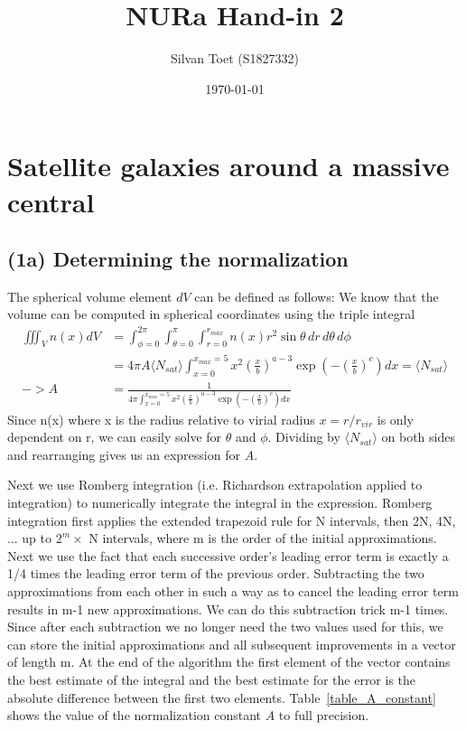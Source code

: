 \documentclass{article}
\title{NURa Hand-in 2}
\author{Silvan Toet (S1827332)}
\date{\today}
\begin{document}
\maketitle

\section{Satellite galaxies around a massive central}

\subsection{(1a) Determining the normalization}
The spherical volume element \(dV\) can be defined as follows:
We know that the volume can be computed in spherical coordinates using the triple integral
\begin{align}
  \iiint_V n(x) dV & = \int_{\phi=0}^{2\pi} \int_{\theta=0}^{\pi} \int_{r=0}^{r_{max}} n(x) r^2 \sin\theta \, dr\,d\theta\,d\phi                                                \\
                   & = 4 \pi A \langle N_{sat} \rangle \int_{x=0}^{x_{max}=5} x^2 \left(\frac{x}{b}\right)^{a-3} \exp(-\left(\frac{x}{b}\right)^c) dx = \langle N_{sat} \rangle \\
  -> A             & = \frac{1}{4 \pi \int_{x=0}^{x_{max}=5} x^2 \left(\frac{x}{b}\right)^{a-3} \exp(-\left(\frac{x}{b}\right)^c) dx}
\end{align}
Since n(x) where x is the radius relative to virial radius \(x=r/r_{vir}\) is only dependent on r, we can easily solve for \(\theta\) and \(\phi\).
Dividing by \(\langle N_{sat} \rangle\) on both sides and rearranging gives us an expression for \(A\).

Next we use Romberg integration (i.e. Richardson extrapolation applied to integration) to numerically integrate the integral in the expression.
Romberg integration first applies the extended trapezoid rule for N intervals, then 2N, 4N, ... up to $2^m\times$ N intervals, where m is the order of the initial approximations.
Next we use the fact that each successive order's leading error term is exactly a 1/4 times the leading error term of the previous order.
Subtracting the two approximations from each other in such a way as to cancel the leading error term results in m-1 new approximations.
We can do this subtraction trick m-1 times. Since after each subtraction we no longer need the two values used for this, we can store the initial approximations and all subsequent improvements in a vector of length m.
At the end of the algorithm the first element of the vector contains the best estimate of the integral and the best estimate for the error is the absolute difference between the first two elements.
Table~\ref{table_A_constant} shows the value of the normalization constant \(A\) to full precision.
\end{document}

